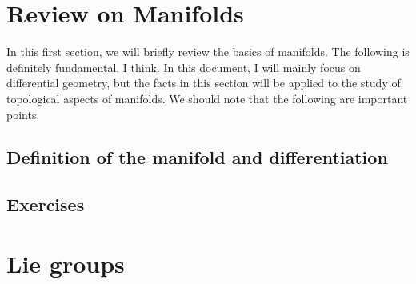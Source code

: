 \documentclass[a4paper,pdftex,10pt]{article}
\begin{document}
\maketitle

\tableofcontents

\clearpage
\section{Review on Manifolds}

In this first section, we will briefly review the basics of manifolds. The following is definitely fundamental, I think. In this document, I will mainly focus on differential geometry, but the facts in this section will be applied to the study of topological aspects of manifolds. We should note that the following are important points.

\subsection{Definition of the manifold and differentiation}







\subsection{Exercises}









\clearpage
\section{Lie groups}












\clearpage



\nocite{Nakahara:2003}
\nocite{Hamilton:2017gbn}
\nocite{Bott:1982xhp}

\end{document}
